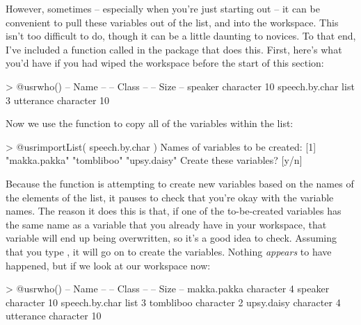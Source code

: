 However, sometimes -- especially when you're just starting out -- it can be convenient to pull these variables out of the list, and into the workspace. This isn't too difficult to do, though it can be a little daunting to novices. To that end, I've included a function called  in the  package that does this. First, here's what you'd have if you had wiped the workspace before the start of this section:
\begin{rblock1}
> @usr{who()}
   -- Name --       -- Class --   -- Size --
   speaker          character     10        
   speech.by.char   list           3        
   utterance        character     10     
\end{rblock1}
Now we use the  function to copy all of the variables within the  list:
\begin{rblock1}
> @usr{importList( speech.by.char )}
Names of variables to be created:
[1] "makka.pakka" "tombliboo"   "upsy.daisy" 
Create these variables? [y/n] 
\end{rblock1}
Because the  function is attempting to create new variables based on the names of the elements of the list, it pauses to check that you're okay with the variable names. The reason it does this is that, if one of the to-be-created variables has the same name as a variable that you already have in your workspace, that variable will end up being overwritten, so it's a good idea to check. Assuming that you type , it will go on to create the variables. Nothing {\it appears} to have happened, but if we look at our workspace now:
\begin{rblock1}
> @usr{who()}
   -- Name --       -- Class --   -- Size --
   makka.pakka      character      4        
   speaker          character     10        
   speech.by.char   list           3        
   tombliboo        character      2        
   upsy.daisy       character      4        
   utterance        character     10 
\end{rblock1}
